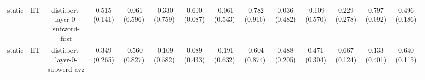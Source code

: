 \begin{sidewaystable}[htb]
\begin{tabular}{@{}cccccccccccccc@{}}
        static & HT & distilbert-layer-0-subword-first & 0.515 (0.141) & -0.061 (0.596) & -0.330 (0.759) & 0.600 (0.087) & -0.061 (0.543) & -0.782 (0.910) & 0.036 (0.482) & -0.109 (0.570) & 0.229 (0.278) & 0.797 (0.092) & 0.496 (0.186) \\
        static & HT & distilbert-layer-0-subword-avg & 0.349 (0.265) & -0.560 (0.827) & -0.109 (0.582) & 0.089 (0.433) & -0.191 (0.632) & -0.604 (0.874) & 0.488 (0.205) & 0.471 (0.304) & 0.667 (0.124) & 0.133 (0.401) & 0.640 (0.115) \\
        \bottomrule
    \end{tabular}
\end{sidewaystable}